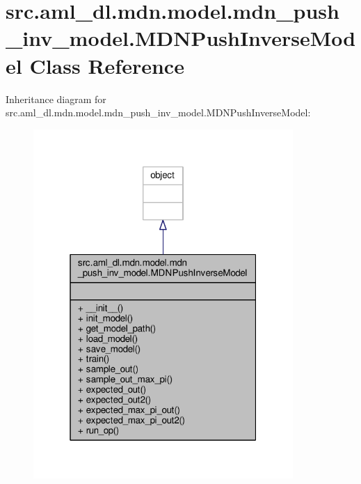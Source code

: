 \hypertarget{classsrc_1_1aml__dl_1_1mdn_1_1model_1_1mdn__push__inv__model_1_1_m_d_n_push_inverse_model}{\section{src.\-aml\-\_\-dl.\-mdn.\-model.\-mdn\-\_\-push\-\_\-inv\-\_\-model.\-M\-D\-N\-Push\-Inverse\-Model Class Reference}
\label{classsrc_1_1aml__dl_1_1mdn_1_1model_1_1mdn__push__inv__model_1_1_m_d_n_push_inverse_model}
}


Inheritance diagram for src.\-aml\-\_\-dl.\-mdn.\-model.\-mdn\-\_\-push\-\_\-inv\-\_\-model.\-M\-D\-N\-Push\-Inverse\-Model\-:
\nopagebreak
\begin{figure}[H]
\begin{center}
\leavevmode
\includegraphics[width=280pt]{classsrc_1_1aml__dl_1_1mdn_1_1model_1_1mdn__push__inv__model_1_1_m_d_n_push_inverse_model__inherit__graph}
\end{center}
\end{figure}


